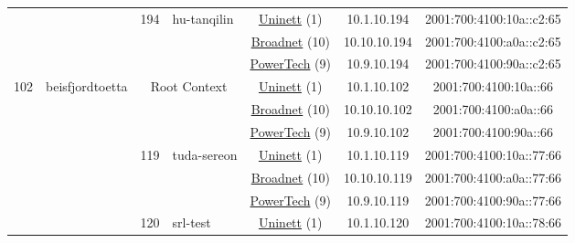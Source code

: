 \begin{small}
\begin{center}
\begin{longtable}{|c|c|c|c|c|c|c|c|}
  &  & \multirow{3}{*}{\tiny{194}} & \multicolumn{1}{|l|}{\multirow{3}{*}{\tiny{hu-tanqilin}}} & \multicolumn{2}{|c|}{\tiny{\href{https://www.uninett.no}{Uninett} (1)}} & \tiny{10.1.10.194} & \tiny{2001:700:4100:10a::c2:65} \\* \cline{5-5}\cline{6-6}\cline{7-7}\cline{8-8}
  &  &  &  & \multicolumn{2}{|c|}{\tiny{\href{https://www.broadnet.no}{Broadnet} (10)}} & \tiny{10.10.10.194} & \tiny{2001:700:4100:a0a::c2:65} \\* \cline{5-5}\cline{6-6}\cline{7-7}\cline{8-8}
  &  &  &  & \multicolumn{2}{|c|}{\tiny{\href{http://www.powertech.no}{PowerTech} (9)}} & \tiny{10.9.10.194} & \tiny{2001:700:4100:90a::c2:65} \\ \hline
 \multirow{54}{*}{\tiny{102}} & \multicolumn{1}{|l|}{\multirow{54}{*}{\tiny{beisfjordtoetta}}} & \multicolumn{2}{|c|}{\multirow{3}{*}{\tiny{Root Context}}} & \multicolumn{2}{|c|}{\tiny{\href{https://www.uninett.no}{Uninett} (1)}} & \tiny{10.1.10.102} & \tiny{2001:700:4100:10a::66} \\* \cline{5-5}\cline{6-6}\cline{7-7}\cline{8-8}
  &  & \multicolumn{2}{|c|}{} & \multicolumn{2}{|c|}{\tiny{\href{https://www.broadnet.no}{Broadnet} (10)}} & \tiny{10.10.10.102} & \tiny{2001:700:4100:a0a::66} \\* \cline{5-5}\cline{6-6}\cline{7-7}\cline{8-8}
  &  & \multicolumn{2}{|c|}{} & \multicolumn{2}{|c|}{\tiny{\href{http://www.powertech.no}{PowerTech} (9)}} & \tiny{10.9.10.102} & \tiny{2001:700:4100:90a::66} \\* \cline{3-3}\cline{4-4}\cline{5-5}\cline{6-6}\cline{7-7}\cline{8-8}
  &  & \multirow{3}{*}{\tiny{119}} & \multicolumn{1}{|l|}{\multirow{3}{*}{\tiny{tuda-sereon}}} & \multicolumn{2}{|c|}{\tiny{\href{https://www.uninett.no}{Uninett} (1)}} & \tiny{10.1.10.119} & \tiny{2001:700:4100:10a::77:66} \\* \cline{5-5}\cline{6-6}\cline{7-7}\cline{8-8}
  &  &  &  & \multicolumn{2}{|c|}{\tiny{\href{https://www.broadnet.no}{Broadnet} (10)}} & \tiny{10.10.10.119} & \tiny{2001:700:4100:a0a::77:66} \\* \cline{5-5}\cline{6-6}\cline{7-7}\cline{8-8}
  &  &  &  & \multicolumn{2}{|c|}{\tiny{\href{http://www.powertech.no}{PowerTech} (9)}} & \tiny{10.9.10.119} & \tiny{2001:700:4100:90a::77:66} \\* \cline{3-3}\cline{4-4}\cline{5-5}\cline{6-6}\cline{7-7}\cline{8-8}
  &  & \multirow{3}{*}{\tiny{120}} & \multicolumn{1}{|l|}{\multirow{3}{*}{\tiny{srl-test}}} & \multicolumn{2}{|c|}{\tiny{\href{https://www.uninett.no}{Uninett} (1)}} & \tiny{10.1.10.120} & \tiny{2001:700:4100:10a::78:66} \\* \cline{5-5}\cline{6-6}\cline{7-7}\cline{8-8}

\end{longtable}
\end{center}
\end{small}
